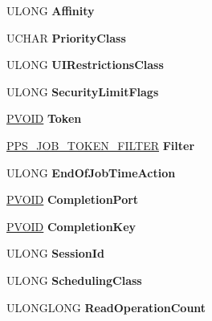 \begin{DoxyCompactItemize}
U\+L\+O\+NG {\bfseries Affinity}
\item 
\mbox{\label{struct___e_j_o_b_a3961255dc9e9c617e9d76b61ed59d09e}} 
U\+C\+H\+AR {\bfseries Priority\+Class}
\item 
\mbox{\label{struct___e_j_o_b_a42d082cab5237ea940fe359b740721b8}} 
U\+L\+O\+NG {\bfseries U\+I\+Restrictions\+Class}
\item 
\mbox{\label{struct___e_j_o_b_a957b25e2603953db4ae3979de95f39d9}} 
U\+L\+O\+NG {\bfseries Security\+Limit\+Flags}
\item 
\mbox{\label{struct___e_j_o_b_a747b75f516863b7d50db53e0abe81018}} 
\hyperlink{interfacevoid}{P\+V\+O\+ID} {\bfseries Token}
\item 
\mbox{\label{struct___e_j_o_b_abdfc791a3704808f79ed002c5a230588}} 
\hyperlink{struct___p_s___j_o_b___t_o_k_e_n___f_i_l_t_e_r}{P\+P\+S\+\_\+\+J\+O\+B\+\_\+\+T\+O\+K\+E\+N\+\_\+\+F\+I\+L\+T\+ER} {\bfseries Filter}
\item 
\mbox{\label{struct___e_j_o_b_af44072dbd83e5a71bf6d3fcc9a69f7fd}} 
U\+L\+O\+NG {\bfseries End\+Of\+Job\+Time\+Action}
\item 
\mbox{\label{struct___e_j_o_b_a4acd15789e6705eb9207b8bd69dd20d4}} 
\hyperlink{interfacevoid}{P\+V\+O\+ID} {\bfseries Completion\+Port}
\item 
\mbox{\label{struct___e_j_o_b_a7866aa725246e655b4711b3542e501ca}} 
\hyperlink{interfacevoid}{P\+V\+O\+ID} {\bfseries Completion\+Key}
\item 
\mbox{\label{struct___e_j_o_b_afb0454df61f5729271f83ed0a9626282}} 
U\+L\+O\+NG {\bfseries Session\+Id}
\item 
\mbox{\label{struct___e_j_o_b_a6184b5d44b7511349059d5b31541582e}} 
U\+L\+O\+NG {\bfseries Scheduling\+Class}
\item 
\mbox{\label{struct___e_j_o_b_a9e5b8b1fb001e6fcff254cd1f0820c8c}} 
U\+L\+O\+N\+G\+L\+O\+NG {\bfseries Read\+Operation\+Count}

\end{DoxyCompactItemize}
